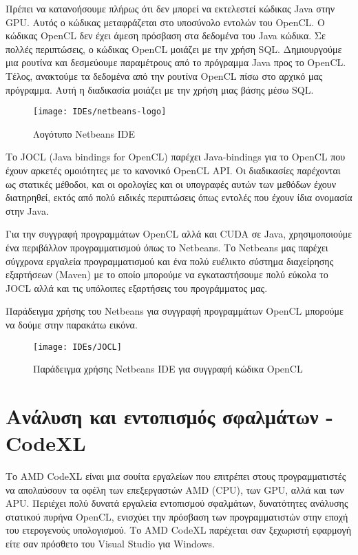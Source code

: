 Πρέπει να κατανοήσουμε πλήρως ότι δεν μπορεί να εκτελεστεί κώδικας Java στην GPU. Αυτός ο κώδικας μεταφράζεται στο υποσύνολο εντολών του OpenCL. Ο κώδικας OpenCL δεν έχει άμεση πρόσβαση στα δεδομένα του Java κώδικα. Σε πολλές περιπτώσεις, ο κώδικας OpenCL μοιάζει με την χρήση SQL. Δημιουργούμε μια ρουτίνα και δεσμεύουμε παραμέτρους από το πρόγραμμα Java προς το OpenCL.\cite{ides-3} Τέλος, ανακτούμε τα δεδομένα από την ρουτίνα OpenCL πίσω στο αρχικό μας πρόγραμμα. Αυτή η διαδικασία μοιάζει με την χρήση μιας βάσης μέσω SQL.
\begin{figure}[h]
\centering
\texttt{[image: IDEs/netbeans-logo]}
\caption{Λογότυπο Netbeans IDE\cite{figure-28}}
\end{figure}

Το JOCL (Java bindings for OpenCL) παρέχει Java-bindings για το OpenCL που έχουν αρκετές ομοιότητες με το κανονικό OpenCL API. Οι διαδικασίες παρέχονται ως στατικές μέθοδοι, και οι ορολογίες και οι υπογραφές αυτών των μεθόδων έχουν διατηρηθεί, εκτός από πολύ ειδικές περιπτώσεις όπως εντολές που έχουν ίδια ονομασία στην Java.

Για την συγγραφή προγραμμάτων OpenCL αλλά και CUDA σε Java, χρησιμοποιούμε ένα περιβάλλον προγραμματισμού όπως το Netbeans. Το Netbeans μας παρέχει σύγχρονα εργαλεία προγραμματισμού και ένα πολύ ευέλικτο σύστημα διαχείρησης εξαρτήσεων (Maven) με το οποίο μπορούμε να εγκαταστήσουμε πολύ εύκολα το JOCL αλλά και τις υπόλοιπες εξαρτήσεις του προγράμματος μας.

Παράδειγμα χρήσης του Netbeans για συγγραφή προγραμμάτων OpenCL μπορούμε να δούμε στην παρακάτω εικόνα.
\begin{figure}[h]
\centering
\texttt{[image: IDEs/JOCL]}
\caption{Παράδειγμα χρήσης Netbeans IDE για συγγραφή κώδικα OpenCL}
\end{figure}

\section{Ανάλυση και εντοπισμός σφαλμάτων - CodeXL}
Το AMD CodeXL είναι μια σουίτα εργαλείων που επιτρέπει στους προγραμματιστές να απολαύσουν τα οφέλη των επεξεργαστών AMD (CPU), των GPU, αλλά και των APU. Περιέχει πολύ δυνατά εργαλεία εντοπισμού σφαλμάτων, δυνατότητες ανάλυσης στατικού πυρήνα OpenCL, ενισχύει την πρόσβαση των προγραμματιστών στην εποχή του ετερογενούς υπολογισμού. Το AMD CodeXL παρέχεται σαν ξεχωριστή εφαρμογή είτε σαν πρόσθετο του Visual Studio για Windows.


